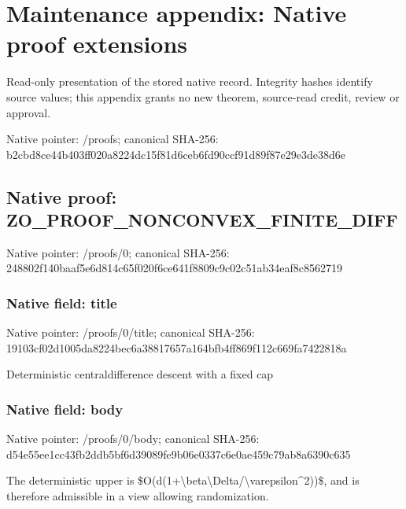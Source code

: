 \documentclass[10pt,a4paper]{article}
\begin{document}
\section{Maintenance appendix: Native proof extensions}


Read-only presentation of the stored native record. Integrity hashes identify source values; this appendix grants no new theorem, source-read credit, review or approval.



Native pointer: /proofs; canonical SHA-256: b2cbd8ce44b403ff020a8224\allowbreak{}dc15f81d6ceb6fd90ccf91d8\allowbreak{}9f87e29e3de38d6e



\subsection{Native proof: ZO\_PROOF\_NONCONVEX\_FINITE\_DIFF}


Native pointer: /proofs/0; canonical SHA-256: 248802f140baaf5e6d814c65\allowbreak{}f020f6ce641f8809c9c02c51\allowbreak{}ab34eaf8c8562719



\subsubsection{Native field: title}


Native pointer: /proofs/0/title; canonical SHA-256: 19103cf02d1005da8224bec6\allowbreak{}a38817657a164bfb4ff869f1\allowbreak{}12c669fa7422818a


Deterministic centraldifference descent with a fixed cap


\subsubsection{Native field: body}


Native pointer: /proofs/0/body; canonical SHA-256: d54e55ee1cc43fb2ddb5bf6d\allowbreak{}39089fe9b06e0337c6e0ae45\allowbreak{}9c79ab8a6390c635


The deterministic upper is \$O(d(1+\textbackslash{}beta\textbackslash{}Delta/\textbackslash{}varepsilon\textasciicircum{}2))\$, and is therefore admissible in a view allowing randomization.
\end{document}

